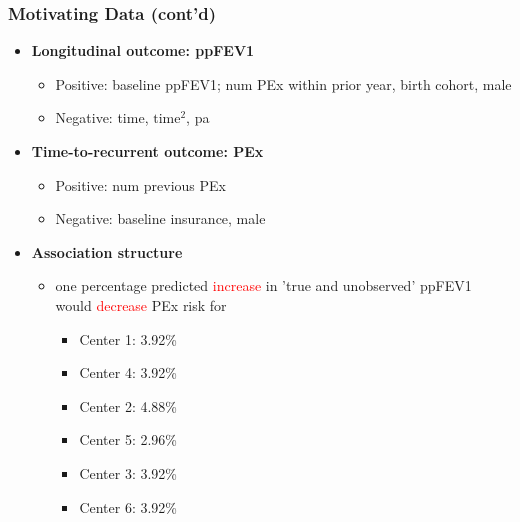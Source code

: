 \documentclass[fleqn]{beamer}
\begin{document}
\begin{frame}
\frametitle{Motivating Data (cont'd)}
\begin{itemize}
    \item \textbf{Longitudinal outcome: ppFEV1}
    \begin{itemize}
        \item Positive: baseline ppFEV1; num PEx within prior year, birth cohort, male
        \item Negative: time, $\mbox{time}^2$, pa
    \end{itemize}
    \item \textbf{Time-to-recurrent outcome: PEx}
    \begin{itemize}
        \item Positive: num previous PEx
        \item Negative: baseline insurance, male
    \end{itemize}
    \item \textbf{Association structure}
    \begin{itemize}
        \item one percentage predicted \textcolor{red}{increase} in ’true and unobserved’ ppFEV1 would \textcolor{red}{decrease} PEx risk for 
         \begin{multicols}{3}
            \begin{itemize}
                  \item Center 1: 3.92\%
                  \item Center 4: 3.92\%
                  \item Center 2: 4.88\%
                  \item Center 5: 2.96\%
                  \item Center 3: 3.92\%
                  \item Center 6: 3.92\%
            \end{itemize}
        \end{multicols}
    \end{itemize}
\end{itemize}
\end{frame}
\end{document}
